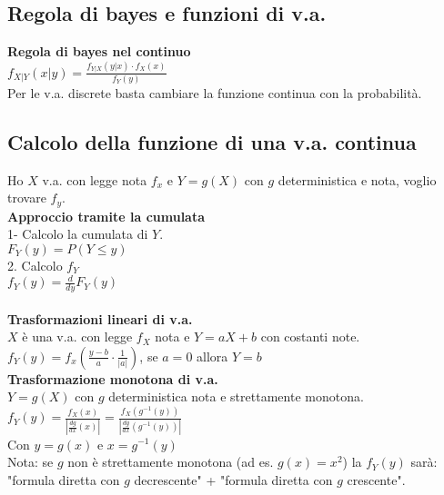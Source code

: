 \documentclass{article}
\begin{document}
\begin{multicols*}{3}
		
		\section{Regola di bayes e funzioni di v.a.}
		\textbf{Regola di bayes nel continuo}\\
		\(f_{X|Y} (x|y) = \frac{f_{Y|X} (y|x)\cdot f_X(x)}{f_Y (y)}\)\\
		Per le v.a. discrete basta cambiare la funzione continua con la probabilità.\\
		\subsection{Calcolo della funzione di una v.a. continua}
		Ho \(X\) v.a. con legge nota \(f_x\) e \(Y=g(X)\) con \(g\) deterministica e nota, voglio trovare \(f_y\).\\
		\textbf{Approccio tramite la cumulata}\\
		1- Calcolo la cumulata di \(Y\).\\
		\(F_Y(y) = P(Y\leq y)\)\\
		2. Calcolo \(f_Y\)\\
		\(f_Y (y)= \frac{d}{dy} F_Y (y)\)\\\\
		\textbf{Trasformazioni lineari di v.a.}\\
		\(X\) è una v.a. con legge \(f_X\) nota e \(Y = aX + b\) con costanti note.\\
		\(f_Y(y) = f_x(\frac{y-b}{a}\cdot \frac{1}{|a|})\), se \(a=0\) allora \(Y=b\)\\
		\textbf{Trasformazione monotona di v.a.}\\
		\(Y = g(X) \) con \(g\) deterministica nota e strettamente monotona.\\
		\(f_Y (y) = \frac{f_X (x) }{|\frac{dg}{dx} (x)|} = \frac{f_X (g^{-1} (y))}{|\frac{dg}{dx} (g^{-1} (y))|}\)\\
		Con \(y= g(x)\) e \(x=g^{-1}(y)\)\\
		Nota: se \(g\) non è strettamente monotona (ad es. \(g(x)= x^2\)) la \(f_Y(y) \) sarà: "formula diretta con \(g\) decrescente" + "formula diretta con \(g\) crescente".\\

\end{multicols*}
\end{document}
